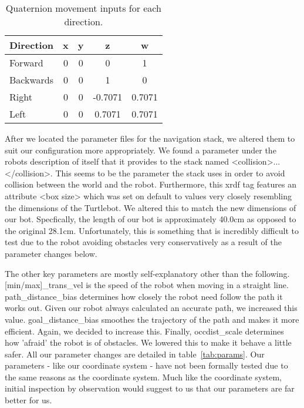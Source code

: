 \documentclass{article}
\begin{document}
\begin{table}[h]
\vskip 3mm
\begin{center}
\begin{small}
\begin{sc}
\begin{tabular}{lcccc}
\hline
\abovespace\belowspace
Direction & x & y & z & w \\
\hline
  Forward & 0 & 0 & 0 & 1\\
  Backwards & 0 & 0 & 1 & 0 \\
  Right & 0 & 0 & -0.7071 & 0.7071 \\
  Left & 0 & 0 & 0.7071 & 0.7071 
\end{tabular}
\end{sc}
\end{small}
\caption{Quaternion movement inputs for each direction.}
\label{tab:quaternions}
\end{center}
\vskip -3mm
\end{table}

After we located the parameter files for the navigation stack, we altered them to suit our configuration more appropriately. We found a parameter under the robots description of itself that it provides to the stack named <collision>...</collision>. This seems to be the parameter the stack uses in order to avoid collision between the world and the robot. Furthermore, this xrdf tag features an attribute <box size> which was set on default to values very closely resembling the dimensions of the Turtlebot. We altered this to match the new dimensions of our bot. Specfically, the length of our bot is approximately 40.0cm as opposed to the original 28.1cm. Unfortunately, this is something that is incredibly difficult to test due to the robot avoiding obstacles very conservatively as a result of the parameter changes below.

The other key parameters are mostly self-explanatory other than the following. [min/max]\_trans\_vel is the speed of the robot when moving in a straight line. path\_distance\_bias determines how closely the robot need follow the path it works out. Given our robot always calculated an accurate path, we increased this value. goal\_distance\_bias smoothes the trajectory of the path and makes it more efficient. Again, we decided to increase this. Finally, occdist\_scale determines how 'afraid' the robot is of obstacles. We lowered this to make it behave a little safer. All our parameter changes are detailed in table~\ref{tab:params}. Our parameters - like our coordinate system - have not been formally tested due to the same reasons as the coordinate system. Much like the coordinate system, initial inspection by observation would suggest to us that our parameters are far better for us.
\end{document}
